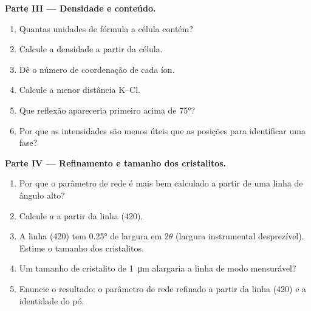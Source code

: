 \begin{problem}
\medskip\noindent\textbf{Parte III --- Densidade e conteúdo.}
\begin{enumerate}[resume]
  \item Quantas unidades de fórmula a célula contém?
  \item Calcule a densidade a partir da célula.
  \item Dê o número de coordenação de cada íon.
  \item Calcule a menor distância K--Cl.
  \item Que reflexão apareceria primeiro acima de \ang{75}?
  \item Por que as intensidades são menos úteis que as posições para identificar uma fase?
\end{enumerate}

\medskip\noindent\textbf{Parte IV --- Refinamento e tamanho dos cristalitos.}
\begin{enumerate}[resume]
  \item Por que o parâmetro de rede é mais bem calculado a partir de uma linha de ângulo alto?
  \item Calcule $a$ a partir da linha (420).
  \item A linha (420) tem \ang{0.25} de largura em $2\theta$ (largura instrumental
        desprezível). Estime o tamanho dos cristalitos.
  \item Um tamanho de cristalito de \qty{1}{\micro m} alargaria a linha de modo mensurável?
  \item Enuncie o resultado: o parâmetro de rede refinado a partir da linha (420) e
        a identidade do pó.
\end{enumerate}
\end{problem}
